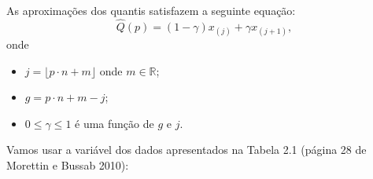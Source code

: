 \documentclass[
  10pt,
  ignorenonframetext,
]{beamer}
\newenvironment{Shaded}{\begin{snugshade}}{\end{snugshade}}
\newcommand{\DecValTok}[1]{\textcolor[rgb]{0.68,0.00,0.00}{#1}}
\newcommand{\FunctionTok}[1]{\textcolor[rgb]{0.28,0.35,0.67}{#1}}
\newcommand{\NormalTok}[1]{\textcolor[rgb]{0.00,0.23,0.31}{#1}}
\newcommand{\OtherTok}[1]{\textcolor[rgb]{0.00,0.23,0.31}{#1}}
\newcommand{\SpecialCharTok}[1]{\textcolor[rgb]{0.37,0.37,0.37}{#1}}
\newcommand{\StringTok}[1]{\textcolor[rgb]{0.13,0.47,0.30}{#1}}
\providecommand{\tightlist}{%
  \setlength{\itemsep}{0pt}\setlength{\parskip}{0pt}}\usepackage{longtable,booktabs,array}
\begin{document}
\begin{frame}[fragile]
As aproximações dos quantis satisfazem a seguinte equação: \[
\hat{Q}(p) = (1-\gamma)x_{(j)} + \gamma x_{(j+1)},
\] onde

\begin{itemize}
\tightlist
\item
  \(j=\lfloor p \cdot n +m \rfloor\) onde \(m\in \mathbb{R}\);
\item
  \(g=p\cdot n + m - j\);
\item
  \(0 \leq \gamma \leq 1\) é uma função de \(g\) e \(j\).
\end{itemize}

Vamos usar a variável dos dados apresentados na Tabela 2.1 (página 28 de
Morettin e Bussab 2010):

\begin{Shaded}
\end{Shaded}
\end{frame}
\end{document}
